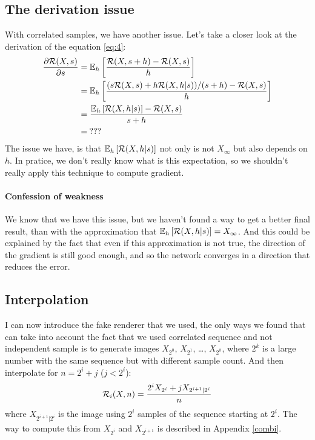\documentclass{classeENS}
\begin{document}
\subsection{The derivation issue}

With correlated samples, we have another issue.
Let's take a closer look at the derivation of the equation \ref{eq:4}:
\begin{align*}
    \label{eq:4}
 \frac{\partial \mathcal R(X,s)}{\partial s} & = \mathbb E_h \left [\frac{\mathcal R(X,s+h) - \mathcal R(X,s)}{h} \right ] \\
    & = \mathbb E_h \left [\frac{(s\mathcal R(X,s) + h\mathcal R(X,h | s))/(s+h) - \mathcal R(X,s)}{h}\right ] \\
    & = \frac{\mathbb E_h \left [\mathcal R(X,h | s) \right ] - \mathcal R(X,s)}{s+h} \\
    & =\:???
\end{align*}
The issue we have, is that $\mathbb E_h \left [\mathcal R(X,h | s) \right ]$ not only is not $X_\infty$ 
but also depends on $h$. In pratice, we don't really know what is this expectation, so we
shouldn't really apply this technique to compute gradient.

\paragraph*{Confession of weakness} We know that we have this issue, but we haven't found 
a way to get a better final result, than with the approximation that 
$\mathbb E_h \left [\mathcal R(X,h | s) \right ] = X_\infty$. And this could be explained by the fact that 
even if this approximation is not true, the direction of the gradient is still good 
enough, and so the network converges in a direction that reduces the error.

\subsection{Interpolation}

I can now introduce the fake renderer that we used, the only ways we found that can
take into account the fact that we used correlated sequence and not independent sample
is to generate images $X_{2^0}$, $X_{2^1}$, \dots, $X_{2^k}$, where $2^k$ is a large number
with the same sequence but with different sample count. And then interpolate for 
$n = 2^i + j$ ($j < 2^i$):
\begin{equation}
    \label{eq:5}
    \mathcal R_i(X,n) = \frac{2^i X_{2^i} + j X_{2^{i+1} | 2^i}}{n}
\end{equation}
where $X_{2^{i+1} | 2^i}$ is the image using $2^i$ samples of the sequence starting at 
$2^i$. The way to compute this from $X_{2^i}$ and $X_{2^{i+1}}$ is described in Appendix \ref{combi}.
\end{document}
